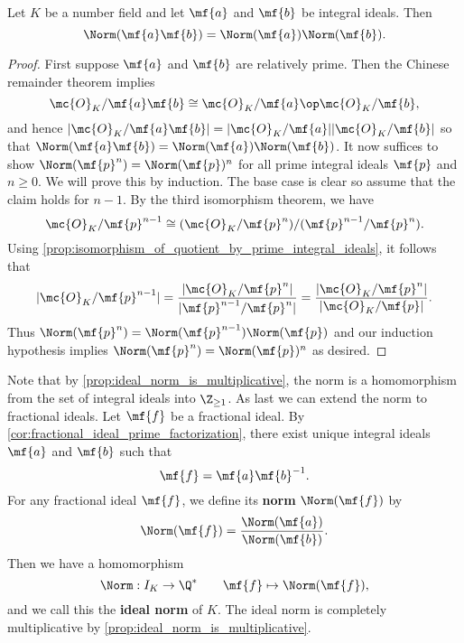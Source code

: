     \begin{proposition}\label{prop:ideal_norm_is_multiplicative}
      Let $K$ be a number field and let $\mf{a}$ and $\mf{b}$ be integral ideals. Then
      \[
        \Norm(\mf{a}\mf{b}) = \Norm(\mf{a})\Norm(\mf{b}).
      \]
    \end{proposition}
    \begin{proof}
      First suppose $\mf{a}$ and $\mf{b}$ are relatively prime. Then the Chinese remainder theorem implies
      \[
        \mc{O}_{K}/\mf{a}\mf{b} \cong \mc{O}_{K}/\mf{a} \op \mc{O}_{K}/\mf{b},
      \]
      and hence $|\mc{O}_{K}/\mf{a}\mf{b}| = |\mc{O}_{K}/\mf{a}||\mc{O}_{K}/\mf{b}|$ so that $\Norm(\mf{a}\mf{b}) = \Norm(\mf{a})\Norm(\mf{b})$. It now suffices to show $\Norm(\mf{p}^{n}) = \Norm(\mf{p})^{n}$ for all prime integral ideals $\mf{p}$ and $n \ge 0$. We will prove this by induction. The base case is clear so assume that the claim holds for $n-1$. By the third isomorphism theorem, we have
      \[
        \mc{O}_{K}/\mf{p}^{n-1} \cong (\mc{O}_{K}/\mf{p}^{n})/(\mf{p}^{n-1}/\mf{p}^{n}).
      \]
      Using \cref{prop:isomorphism_of_quotient_by_prime_integral_ideals}, it follows that
      \[
        |\mc{O}_{K}/\mf{p}^{n-1}| = \frac{|\mc{O}_{K}/\mf{p}^{n}|}{|\mf{p}^{n-1}/\mf{p}^{n}|} = \frac{|\mc{O}_{K}/\mf{p}^{n}|}{|\mc{O}_{K}/\mf{p}|}.
      \]
      Thus $\Norm(\mf{p}^{n}) = \Norm(\mf{p}^{n-1})\Norm(\mf{p})$ and our induction hypothesis implies $\Norm(\mf{p}^{n}) = \Norm(\mf{p})^{n}$ as desired.
    \end{proof}

    Note that by \cref{prop:ideal_norm_is_multiplicative}, the norm is a homomorphism from the set of integral ideals into $\Z_{\ge 1}$. As last we can extend the norm to fractional ideals. Let $\mf{f}$ be a fractional ideal. By \cref{cor:fractional_ideal_prime_factorization}, there exist unique integral ideals $\mf{a}$ and $\mf{b}$ such that
    \[
      \mf{f} = \mf{a}\mf{b}^{-1}.
    \]
    For any fractional ideal $\mf{f}$, we define its \textbf{norm} $\Norm(\mf{f})$ by
    \[
      \Norm(\mf{f}) = \frac{\Norm(\mf{a})}{\Norm(\mf{b})}.
    \]
    Then we have a homomorphism
    \[
      \Norm:I_{K} \to \Q^{\ast} \qquad \mf{f} \mapsto \Norm(\mf{f}),
    \]
    and we call this the \textbf{ideal norm} of $K$. The ideal norm is completely multiplicative by \cref{prop:ideal_norm_is_multiplicative}.
